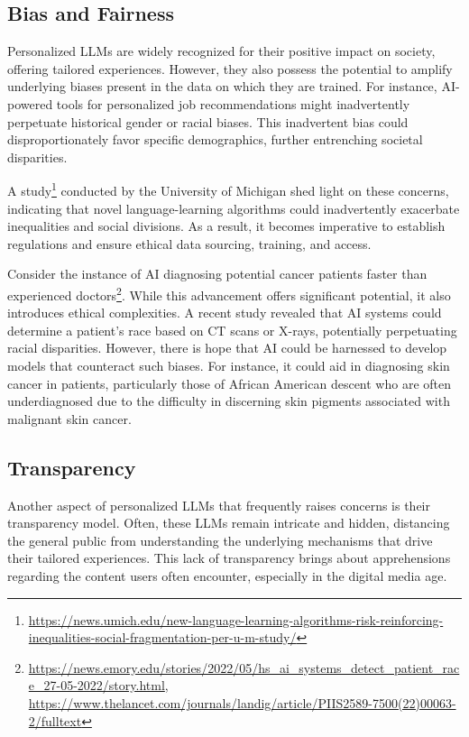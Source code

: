 \documentclass[
]{book}
\begin{document}
\hypertarget{bias-and-fairness}{%
\subsection{Bias and Fairness}\label{bias-and-fairness}}

Personalized LLMs are widely recognized for their positive impact on society, offering tailored experiences. However, they also possess the potential to amplify underlying biases present in the data on which they are trained. For instance, AI-powered tools for personalized job recommendations might inadvertently perpetuate historical gender or racial biases. This inadvertent bias could disproportionately favor specific demographics, further entrenching societal disparities.

A study\footnote{\url{https://news.umich.edu/new-language-learning-algorithms-risk-reinforcing-inequalities-social-fragmentation-per-u-m-study/}} conducted by the University of Michigan shed light on these concerns, indicating that novel language-learning algorithms could inadvertently exacerbate inequalities and social divisions. As a result, it becomes imperative to establish regulations and ensure ethical data sourcing, training, and access.

Consider the instance of AI diagnosing potential cancer patients faster than experienced doctors\footnote{\url{https://news.emory.edu/stories/2022/05/hs_ai_systems_detect_patient_race_27-05-2022/story.html}, \url{https://www.thelancet.com/journals/landig/article/PIIS2589-7500(22)00063-2/fulltext}}. While this advancement offers significant potential, it also introduces ethical complexities. A recent study revealed that AI systems could determine a patient's race based on CT scans or X-rays, potentially perpetuating racial disparities. However, there is hope that AI could be harnessed to develop models that counteract such biases. For instance, it could aid in diagnosing skin cancer in patients, particularly those of African American descent who are often underdiagnosed due to the difficulty in discerning skin pigments associated with malignant skin cancer.

\hypertarget{transparency}{%
\subsection{Transparency}\label{transparency}}

Another aspect of personalized LLMs that frequently raises concerns is their transparency model. Often, these LLMs remain intricate and hidden, distancing the general public from understanding the underlying mechanisms that drive their tailored experiences. This lack of transparency brings about apprehensions regarding the content users often encounter, especially in the digital media age.
\end{document}
